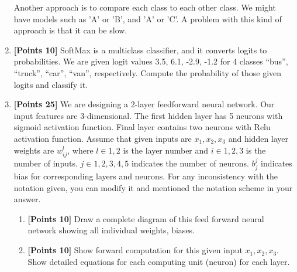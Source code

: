 \documentclass[12pt]{article}
\begin{document}
\begin{enumerate}
          Another approach is to compare each class to each other class. We
          might have models such as 'A' or 'B', and 'A' or 'C'. A problem with
          this kind of approach is that it can be slow.

    \item \textbf{[Points 10]} SoftMax is a multiclass classifier, and it
          converts logits to probabilities. We are given logit values 3.5, 6.1,
          -2.9, -1.2 for 4 classes “bus”, “truck”, “car”, “van”, respectively.
          Compute the probability of those given logits and classify it.

    \item \textbf{[Points 25]} We are designing a 2-layer feedforward neural
          network. Our input features are 3-dimensional. The first hidden layer
          has 5 neurons with sigmoid activation function. Final layer contains
          two neurons with Relu activation function. Assume that given inputs
          are $x_1, x_2, x_3$ and hidden layer weights are $w_{ij}^{l}$, where
          $l \in {1, 2}$ is the layer number and $i \in {1,2,3}$ is the number
          of inputs. $j \in {1,2,3,4,5}$ indicates the number of neurons.
          $b_{j}^{j}$ indicates bias for corresponding layers and neurons. For
          any inconsistency with the notation given, you can modify it and
          mentioned the notation scheme in your answer.

          \begin{enumerate}
              \item \textbf{[Points 10]} Draw a complete diagram of this feed
                    forward neural network showing all individual weights,
                    biases.
              \item \textbf{[Points 10]} Show forward computation for this given
                    input $x_1, x_2, x_3$. Show detailed equations for each
                    computing unit (neuron) for each layer.
          \end{enumerate}
\end{enumerate}
\end{document}
